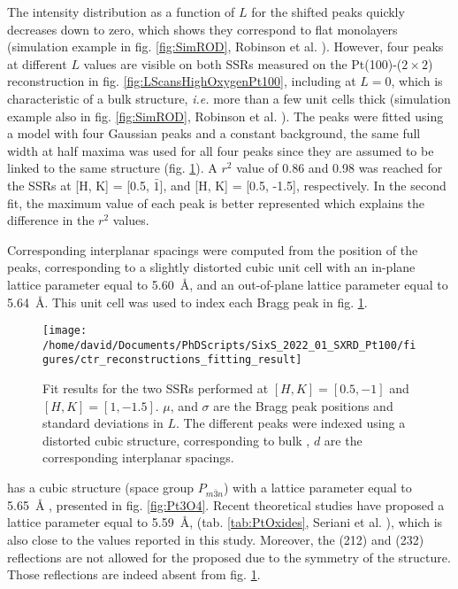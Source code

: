 The intensity distribution as a function of $L$ for the shifted peaks quickly decreases down to zero, which shows they correspond to flat monolayers (simulation example in fig. \ref{fig:SimROD}, Robinson et al. \cite*{Robinson1991}).
However, four peaks at different $L$ values are visible on both SSRs measured on the Pt(100)-($2\times2$) reconstruction in fig. \ref{fig:LScansHighOxygenPt100}, including at $L=0$, which is characteristic of a bulk structure, \textit{i.e.} more than a few unit cells thick (simulation example also in fig. \ref{fig:SimROD}, Robinson et al. \cite*{Robinson1991}).
The peaks were fitted using a model with four Gaussian peaks and a constant background, the same full width at half maxima was used for all four peaks since they are assumed to be linked to the same structure (fig. \ref{fig:FitPt100LScans}).
A $r^2$ value of \num{0.86} and \num{0.98} was reached for the SSRs at [H, K] = [0.5, $\bar{1}$], and [H, K] = [0.5, -1.5], respectively.
In the second fit, the maximum value of each peak is better represented which explains the difference in the $r^2$ values.

Corresponding interplanar spacings were computed from the position of the peaks, corresponding to a slightly distorted cubic unit cell with an in-plane lattice parameter equal to \qty{5.60}{\angstrom}, and an out-of-plane lattice parameter equal to \qty{5.64}{\angstrom}.
This unit cell was used to index each Bragg peak in fig. \ref{fig:FitPt100LScans}.

\begin{figure}[!htb]
    \centering
    \texttt{[image: /home/david/Documents/PhDScripts/SixS\_2022\_01\_SXRD\_Pt100/figures/ctr\_reconstructions\_fitting\_result]}
    \caption{
        Fit results for the two SSRs performed at $[H, K] = [0.5, -1]$ and $[H, K] = [1, -1.5]$.
        $\mu$, and $\sigma$ are the Bragg peak positions and standard deviations in $L$.
        The different peaks were indexed using a distorted cubic structure, corresponding to bulk , $d$ are the corresponding interplanar spacings.
    }
    \label{fig:FitPt100LScans}
\end{figure}

 has a cubic structure (space group $P_{m\bar{3}n}$) with a lattice parameter equal to \qty{5.65}{\angstrom} \parencite{Galloni1941, Galloni1952, Muller1968}, presented in fig. \ref{fig:Pt3O4}.
Recent theoretical studies have proposed a lattice parameter equal to \qty{5.59}{\angstrom}, (tab. \ref{tab:PtOxides}, Seriani et al. \cite*{Seriani2006}), which is also close to the values reported in this study.
Moreover, the (212) and (232) reflections are not allowed for the proposed due to the symmetry of the  structure.
Those reflections are indeed absent from fig. \ref{fig:FitPt100LScans}.

